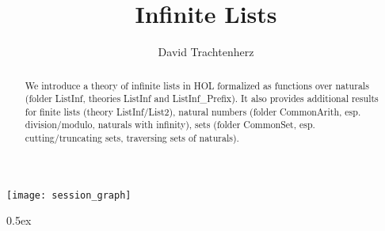\documentclass[11pt,a4paper]{article}
\begin{document}
\title{Infinite Lists}
\author{David Trachtenherz}
\maketitle

\begin{abstract}
We introduce a theory of infinite lists in HOL formalized as functions
over naturals (folder ListInf, theories ListInf and
ListInf\_Prefix). It also provides additional results for finite lists
(theory ListInf/List2), natural numbers (folder CommonArith,
esp. division/modulo, naturals with infinity), sets (folder CommonSet,
esp. cutting/truncating sets, traversing sets of naturals).
\end{abstract}

\tableofcontents

\begin{center}
  \texttt{[image: session\_graph]}
\end{center}

\clearpage

\renewcommand{\isamarkupheader}[1]%
{\section{\isabellecontext: #1}\markright{THEORY~``\isabellecontext''}}

\parindent 0pt\parskip 0.5ex

\end{document}

